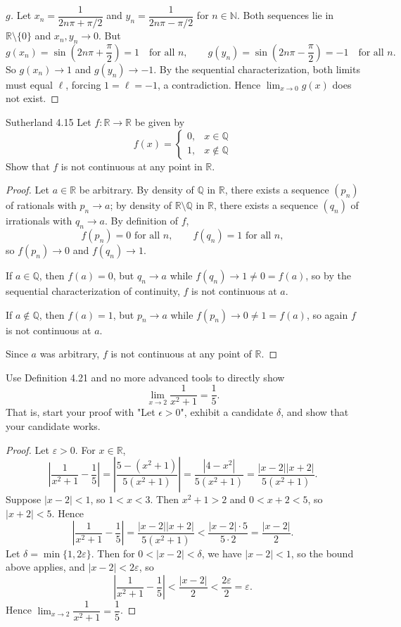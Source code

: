 \documentclass[minion]{homework}
\newcommand{\Reals}{\ensuremath{\mathbb R}}%
\newcommand{\Rats}{\ensuremath{\mathbb Q}} %
\newcommand{\Nats}{\ensuremath{\mathbb N}} %
\begin{document}
\begin{problems}
\begin{proof}[$g$]
  Let $x_n = \dfrac1{2n\pi+\pi/2}$ and $y_n = \dfrac1{2n\pi-\pi/2}$ for $n\in\Nats$. Both sequences lie in $\Reals\setminus\{0\}$ and $x_n,y_n\to0$. But
  $$g(x_n) = \sin\!\left(2n\pi+\frac\pi2\right) = 1 \quad\text{for all }n, \qquad g(y_n) = \sin\!\left(2n\pi-\frac\pi2\right) = -1 \quad\text{for all }n.$$
  So $g(x_n)\to1$ and $g(y_n)\to-1$. By the sequential characterization, both limits must equal $\ell$, forcing $1=\ell=-1$, a contradiction. Hence $\lim_{x\to0} g(x)$ does not exist.
\end{proof}

\problem Sutherland 4.15
Let $f:\Reals\to\Reals$ be given by
\[
f(x) = \begin{cases} 0, & x\in\Rats \\ 1, & x\notin\Rats \end{cases}
\]
Show that $f$ is not continuous at any point in $\Reals$.
\newline
\begin{proof}
  Let $a\in\Reals$ be arbitrary. By density of $\Rats$ in $\Reals$, there exists a sequence $(p_n)$ of rationals with $p_n\to a$; by density of $\Reals\setminus\Rats$ in $\Reals$, there exists a sequence $(q_n)$ of irrationals with $q_n\to a$. By definition of $f$,
  $$f(p_n) = 0 \text{ for all } n, \qquad f(q_n) = 1 \text{ for all } n,$$
  so $f(p_n)\to0$ and $f(q_n)\to1$.

  If $a\in\Rats$, then $f(a)=0$, but $q_n\to a$ while $f(q_n)\to1\neq0=f(a)$, so by the sequential characterization of continuity, $f$ is not continuous at $a$.

  If $a\notin\Rats$, then $f(a)=1$, but $p_n\to a$ while $f(p_n)\to0\neq1=f(a)$, so again $f$ is not continuous at $a$.

  Since $a$ was arbitrary, $f$ is not continuous at any point of $\Reals$.
\end{proof}

\problem Use Definition 4.21 and no more advanced tools to directly show 
\[
\lim_{x\to 2} \frac{1}{x^2+1} = \frac{1}5.
\]
That is, start your proof with "Let $\epsilon>0$", exhibit a candidate
$\delta$, and show that your candidate works.
\newline
\begin{proof}
  Let $\varepsilon>0$. For $x\in\Reals$,
  $$\left|\frac1{x^2+1} - \frac15\right| = \left|\frac{5-(x^2+1)}{5(x^2+1)}\right| = \frac{|4-x^2|}{5(x^2+1)} = \frac{|x-2||x+2|}{5(x^2+1)}.$$
  Suppose $|x-2|<1$, so $1<x<3$. Then $x^2+1>2$ and $0<x+2<5$, so $|x+2|<5$. Hence
  $$\left|\frac1{x^2+1}-\frac15\right| = \frac{|x-2||x+2|}{5(x^2+1)} < \frac{|x-2|\cdot5}{5\cdot2} = \frac{|x-2|}2.$$
  Let $\delta = \min\{1, 2\varepsilon\}$. Then for $0<|x-2|<\delta$, we have $|x-2|<1$, so the bound above applies, and $|x-2|<2\varepsilon$, so
  $$\left|\frac1{x^2+1}-\frac15\right| < \frac{|x-2|}2 < \frac{2\varepsilon}2 = \varepsilon.$$
  Hence $\lim_{x\to2}\dfrac1{x^2+1} = \dfrac15$.
\end{proof}


\end{problems}
\end{document}
